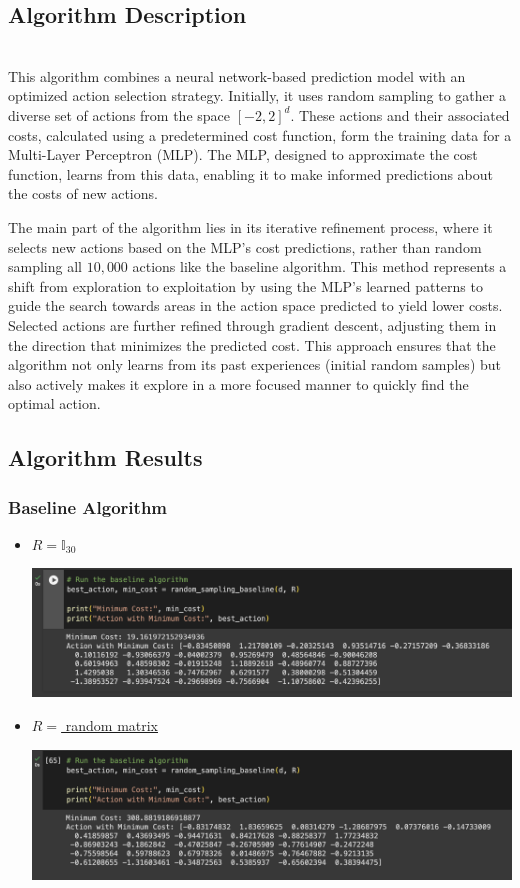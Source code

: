 \documentclass{article}
\begin{document}
\subsection*{Algorithm Description}
\hfill\\ 
This algorithm combines a neural network-based prediction model with an optimized action selection strategy.
Initially, it uses random sampling to gather a diverse set of actions from the space \([-2, 2]^d\). These actions and their associated costs, calculated using a predetermined cost function, form the training data for a Multi-Layer Perceptron (MLP). 
The MLP, designed to approximate the cost function, learns from this data, enabling it to make informed predictions about the costs of new actions.

The main part of the algorithm lies in its iterative refinement process, where it selects new actions based on the MLP's cost predictions, rather than random sampling all $10,000$ actions like the baseline algorithm.
This method represents a shift from exploration to exploitation by using the MLP's learned patterns to guide the search towards areas in the action space predicted to yield lower costs. 
Selected actions are further refined through gradient descent, adjusting them in the direction that minimizes the predicted cost. 
This approach ensures that the algorithm not only learns from its past experiences (initial random samples) but also actively makes it explore in a more focused manner to quickly find the optimal action.
\subsection*{Algorithm Results}
\subsubsection*{Baseline Algorithm}
\begin{itemize}
    \item \underline{$R = \mathbb{I}_{30}$}\par
    \includegraphics[scale=0.5]{BI.png}
    \item \underline{$R= $ random matrix}\par
    \includegraphics[scale=0.5]{BR.png}
\end{itemize}
\end{document}
